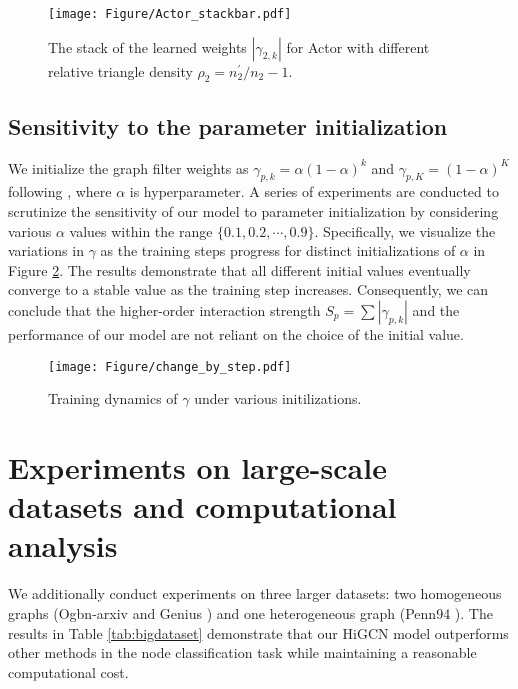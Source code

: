 \documentclass[letterpaper]{article} \usepackage{aaai24}
\theoremstyle{plain}
\theoremstyle{definition}
\theoremstyle{remark}
\begin{document}
\begin{figure}[!htbp]
\centering
\texttt{[image: Figure/Actor\_stackbar.pdf]}
\caption{The stack of the learned weights $|\gamma_{2,k}|$ for Actor with different relative triangle density $\rho_2=n_2^\prime/n_2-1$.}
\label{fig:stackbar_actor}
\end{figure}






\subsection{Sensitivity to the parameter initialization}
\label{appendix:initialize}

We initialize the graph filter weights as $\gamma_{p,k}=\alpha(1-\alpha)^k$  and $\gamma_{p,K}=(1-\alpha)^K$ following \cite{APPNP}, where $\alpha$ is hyperparameter.
A series of experiments are conducted to scrutinize the sensitivity of our model to parameter initialization by considering various $\alpha$ values within the range $\{0.1,0.2,\cdots,0.9\}$. 
Specifically, we visualize the variations in $\gamma$ as the training steps progress for distinct initializations of $\alpha$ in Figure \ref{fig:gammar_change_by_step}. 
The results demonstrate that all different initial values eventually converge to a stable value as the training step increases.
Consequently, we can conclude that the higher-order interaction strength $S_p = \sum |\gamma_{p,k}|$ and the performance of our model are not reliant on the choice of the initial value.


\begin{figure}[!ht]
\centering
\texttt{[image: Figure/change\_by\_step.pdf]}
\caption{Training dynamics of $\gamma$ under various initilizations.}
\label{fig:gammar_change_by_step}
\end{figure}



\section{Experiments on large-scale datasets and computational analysis}
\label{appendix: large}
We additionally conduct experiments on three larger datasets: two homogeneous graphs (Ogbn-arxiv \cite{data:ogbn_arxiv} and Genius \cite{data:genius}) and one heterogeneous graph (Penn94 \cite{data:penn94}). 
The results in Table \ref{tab:bigdataset} demonstrate that our HiGCN model outperforms other methods in the node classification task while maintaining a reasonable computational cost.
\end{document}

